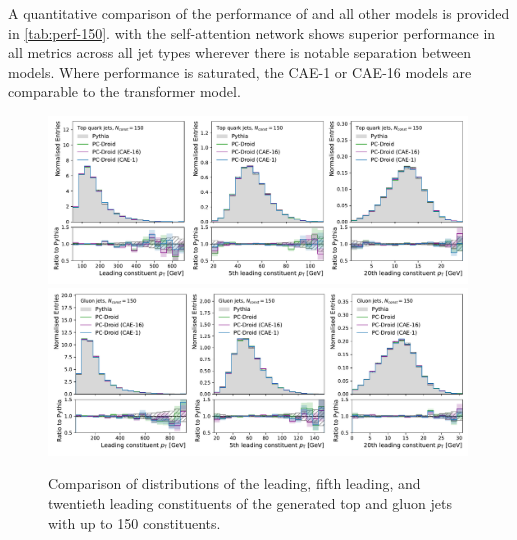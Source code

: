 A quantitative comparison of the performance of \pcdroid and all other models is provided in \cref{tab:perf-150}.
\pcdroid with the self-attention network shows superior performance in all metrics across all jet types wherever there is notable separation between models.
Where performance is saturated, the CAE-1 or CAE-16 models are comparable to the transformer model.

\begin{figure}[tb]
    \centering
    \includegraphics[width=0.99\textwidth]{Figures/jet_generation/droid/150/csts/t/100/t_leading_constituents.pdf}
    \includegraphics[width=0.99\textwidth]{Figures/jet_generation/droid/150/csts/g/100/g_leading_constituents.pdf}
    \caption{Comparison of \pt distributions of the leading, fifth leading, and twentieth leading constituents of the generated top and gluon jets with up to 150 constituents.
    }
    \label{fig:const-pt_dist-150}
\end{figure}

